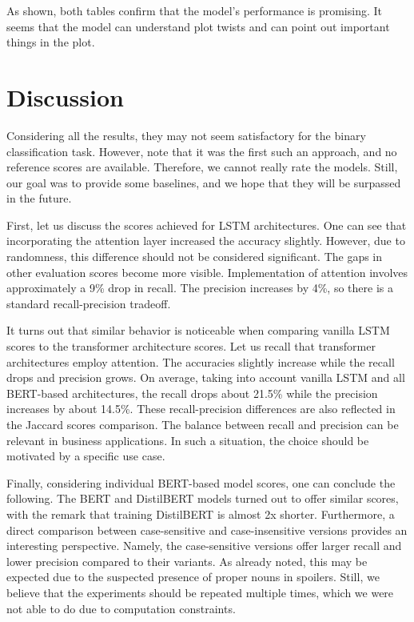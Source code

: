 \documentclass[11pt]{article}
\begin{document}
As shown, both tables confirm that the model's performance is promising. It seems that the model can understand plot twists and can point out important things in the plot.

\section{Discussion} \label{discussion}

Considering all the results, they may not seem satisfactory for the binary classification task. However, note that it was the first such an approach, and no reference scores are available. Therefore, we cannot really rate the models. Still, our goal was to provide some baselines, and we hope that they will be surpassed in the future.

First, let us discuss the scores achieved for LSTM architectures. One can see that incorporating the attention layer increased the accuracy slightly. However, due to randomness, this difference should not be considered significant. The gaps in other evaluation scores become more visible. Implementation of attention involves approximately a 9\% drop in recall. The precision increases by 4\%, so there is a standard recall-precision tradeoff.

It turns out that similar behavior is noticeable when comparing vanilla LSTM scores to the transformer architecture scores. Let us recall that transformer architectures employ attention. The accuracies slightly increase while the recall drops and precision grows. On average, taking into account vanilla LSTM and all BERT-based architectures, the recall drops about 21.5\% while the precision increases by about 14.5\%. These recall-precision differences are also reflected in the Jaccard scores comparison. The balance between recall and precision can be relevant in business applications. In such a situation, the choice should be motivated by a specific use case.

Finally, considering individual BERT-based model scores, one can conclude the following. The BERT and DistilBERT models turned out to offer similar scores, with the remark that training DistilBERT is almost 2x shorter. Furthermore, a direct comparison between case-sensitive and case-insensitive versions provides an interesting perspective. Namely, the case-sensitive versions offer larger recall and lower precision compared to their variants. As already noted, this may be expected due to the suspected presence of proper nouns in spoilers. Still, we believe that the experiments should be repeated multiple times, which we were not able to do due to computation constraints.
\end{document}
